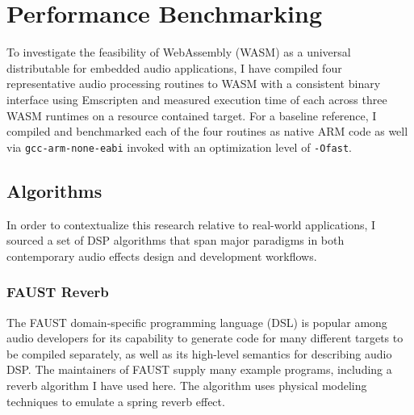 \chapter{ Performance Benchmarking }
\label{sec:bench}

To investigate the feasibility of WebAssembly (WASM) as a universal distributable for embedded audio applications, I have compiled four representative audio processing routines to WASM with a consistent binary interface using Emscripten\cite{emscripten} and measured execution time of each across three WASM runtimes on a resource contained target. For a baseline reference, I compiled and benchmarked each of the four routines as native ARM code as well via \lstinline{gcc-arm-none-eabi} invoked with an optimization level of \lstinline{-Ofast}.


\section{ Algorithms }

In order to contextualize this research relative to real-world applications, I sourced a set of DSP algorithms that span major paradigms in both contemporary audio effects design and development workflows.


\subsection{ FAUST Reverb}

The FAUST domain-specific programming language (DSL) is popular among audio developers for its capability to generate code for many different targets to be compiled separately, as well as its high-level semantics for describing audio DSP. The maintainers of FAUST supply many example programs, including a reverb algorithm I have used here. The algorithm uses physical modeling techniques to emulate a spring reverb effect.

